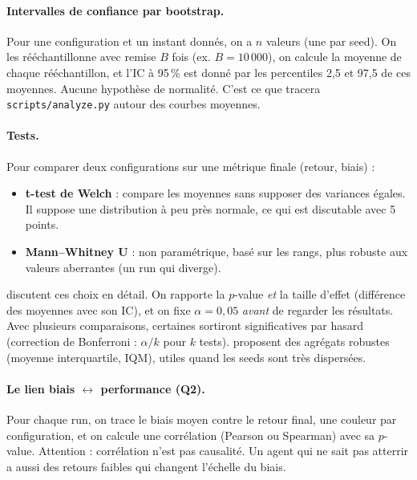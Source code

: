 \documentclass[11pt,a4paper]{article}
\newcommand{\code}[1]{\texttt{#1}}
\begin{document}
\paragraph{Intervalles de confiance par bootstrap.} Pour une configuration et un instant donnés, on a
$n$ valeurs (une par seed). On les rééchantillonne avec remise $B$ fois (ex. $B=10\,000$), on calcule
la moyenne de chaque rééchantillon, et l'IC à 95\,\% est donné par les percentiles 2,5 et 97,5 de ces
moyennes. Aucune hypothèse de normalité. C'est ce que tracera \code{scripts/analyze.py} autour des
courbes moyennes.

\paragraph{Tests.} Pour comparer deux configurations sur une métrique finale (retour, biais) :
\begin{itemize}
  \item \textbf{t-test de Welch} : compare les moyennes sans supposer des variances égales.
    Il suppose une distribution à peu près normale, ce qui est discutable avec 5 points.
  \item \textbf{Mann--Whitney U} : non paramétrique, basé sur les rangs, plus robuste aux valeurs
    aberrantes (un run qui diverge).
\end{itemize}
\citet{colas2019hitchhiker} discutent ces choix en détail. On rapporte la $p$-value \emph{et} la
taille d'effet (différence des moyennes avec son IC), et on fixe $\alpha=0{,}05$ \emph{avant} de
regarder les résultats. Avec plusieurs comparaisons, certaines sortiront significatives par hasard
(correction de Bonferroni : $\alpha/k$ pour $k$ tests). \citet{agarwal2021rliable} proposent des
agrégats robustes (moyenne interquartile, IQM), utiles quand les seeds sont très dispersées.

\paragraph{Le lien biais $\leftrightarrow$ performance (Q2).} Pour chaque run, on trace le biais
moyen contre le retour final, une couleur par configuration, et on calcule une corrélation (Pearson
ou Spearman) avec sa $p$-value. Attention : corrélation n'est pas causalité. Un agent qui ne sait pas
atterrir a aussi des retours faibles qui changent l'échelle du biais.
\end{document}
